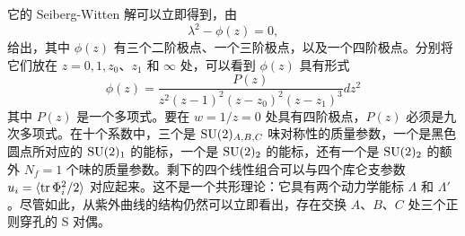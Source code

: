 它的 Seiberg-Witten 解可以立即得到，由
\begin{equation}
\lambda^2-\phi(z)=0,
\end{equation}
给出，其中 $\phi(z)$ 有三个二阶极点、一个三阶极点，以及一个四阶极点。分别将它们放在 $z=0,1,z_0$、$z_1$ 和 $\infty$ 处，可以看到 $\phi(z)$ 具有形式
\begin{equation}
\phi(z)=\frac{P(z)}{z^2(z-1)^2(z-z_0)^2(z-z_1)^3}dz^2
\end{equation}
其中 $P(z)$ 是一个多项式。要在 $w=1/z=0$ 处具有四阶极点，$P(z)$ 必须是九次多项式。在十个系数中，三个是 $\mathop{\mathrm{SU}}(2)_{A,B,C}$ 味对称性的质量参数，一个是黑色圆点所对应的 $\mathop{\mathrm{SU}}(2)_1$ 的能标，一个是 $\mathop{\mathrm{SU}}(2)_2$ 的能标，还有一个是 $\mathop{\mathrm{SU}}(2)_2$ 的额外 $N_f=1$ 个味的质量参数。剩下的四个线性组合可以与四个库仑支参数 $u_i=\langle\mathop{\mathrm{tr}}\nolimits\Phi_i^2/2\rangle$ 对应起来。这不是一个共形理论：它具有两个动力学能标 $\Lambda$ 和 $\Lambda'$。尽管如此，从紫外曲线的结构仍然可以立即看出，存在交换 $A$、$B$、$C$ 处三个正则穿孔的 S 对偶。
